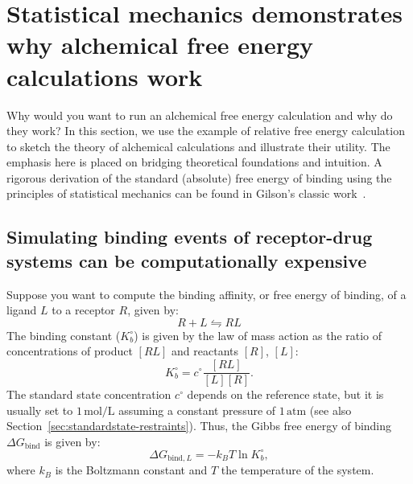 \documentclass[9pt,bestpractices]{livecoms}
\begin{document}
\section{Statistical mechanics demonstrates why alchemical free energy calculations work}
\label{sec:theory}
Why would you want to run an alchemical free energy calculation and why do they work?
In this section, we use the example of relative free energy calculation to sketch the theory of alchemical calculations and illustrate their utility.
The emphasis here is placed on bridging theoretical foundations and intuition.
A rigorous derivation of the standard (absolute) free energy of binding using the principles of statistical mechanics can be found in Gilson's classic work~\cite{gilson1997statisticalthermodynamic}.

\subsection{Simulating binding events of receptor-drug systems can be computationally expensive}
Suppose you want to compute the binding affinity, or free energy of binding, of a ligand $L$ to a receptor $R$, given by:
\begin{equation}
R+L \leftrightharpoons RL
\end{equation}
The binding constant ($K_b^{\circ}$) is given by the law of mass action as the ratio of concentrations of product $[RL]$ and reactants $[R]$, $[L]$:
\begin{equation}
 K_b^{\circ} = c^{\circ}\frac{[RL]}{[L][R]}.
\end{equation}
The standard state concentration $c^\circ$ depends on the reference state, but it is usually set to $1\,\mathrm{mol}/\mathrm{L}$ assuming a constant pressure of $1\,\mathrm{atm}$ (see also Section~\ref{sec:standardstate-restraints}).
Thus, the Gibbs free energy of binding $\Delta G_{\mathrm{bind}}$ is given by:
\begin{equation}
    \Delta G_{\mathrm{bind},L} = -k_BT\ln K_b^{\circ},
\end{equation}
where $k_B$ is the Boltzmann constant and $T$ the temperature of the system.
\end{document}
